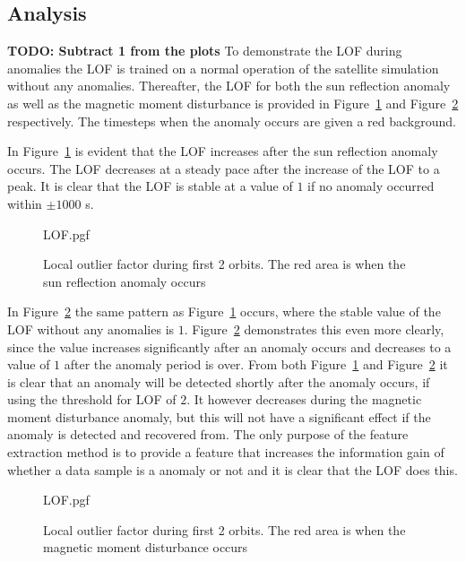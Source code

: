 \subsection{Analysis}
\textbf{TODO: Subtract 1 from the plots}
To demonstrate the LOF during anomalies the LOF is trained on a normal operation of the satellite simulation without any anomalies. Thereafter, the LOF for both the sun reflection anomaly as well as the magnetic moment disturbance is provided in Figure~\ref{fig:reflectionLOF} and Figure~\ref{fig:solarPanelDipoleLOF} respectively. The timesteps when the anomaly occurs are given a red background.

In Figure~\ref{fig:reflectionLOF} is evident that the LOF increases after the sun reflection anomaly occurs. The LOF decreases at a steady pace after the increase of the LOF to a peak. It is clear that the LOF is stable at a value of $1$ if no anomaly occurred within $\pm 1000$ s.

\begin{figure}[!htb]
	\centering
	
	{LOF.pgf}
	
	\caption{Local outlier factor during first 2 orbits. The red area is when the sun reflection anomaly occurs}
	\label{fig:reflectionLOF}
\end{figure}

In Figure~\ref{fig:solarPanelDipoleLOF} the same pattern as Figure~\ref{fig:reflectionLOF} occurs, where the stable value of the LOF without any anomalies is $1$. Figure~\ref{fig:solarPanelDipoleLOF} demonstrates this even more clearly, since the value increases significantly after an anomaly occurs and decreases to a value of $1$ after the anomaly period is over. From both Figure~\ref{fig:reflectionLOF} and Figure~\ref{fig:solarPanelDipoleLOF} it is clear that an anomaly will be detected shortly after the anomaly occurs, if using the threshold for LOF of $2$. It however decreases during the magnetic moment disturbance anomaly, but this will not have a significant effect if the anomaly is detected and recovered from. The only purpose of the feature extraction method is to provide a feature that increases the information gain of whether a data sample is a anomaly or not and it is clear that the LOF does this.

\begin{figure}[!htb]
	\centering
	
	{LOF.pgf}
	
	\caption{Local outlier factor during first 2 orbits. The red area is when the magnetic moment disturbance occurs}
	\label{fig:solarPanelDipoleLOF}
\end{figure}

